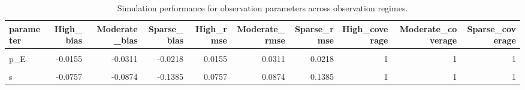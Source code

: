 \begin{table}[!h]
\centering
\caption{\label{tab:tab:obs_regime}Simulation performance for observation parameters across observation regimes.}
\centering
\fontsize{8}{10}\selectfont
\begin{tabular}[t]{lrrrrrrrrr}
\toprule
parameter & High\_bias & Moderate\_bias & Sparse\_bias & High\_rmse & Moderate\_rmse & Sparse\_rmse & High\_coverage & Moderate\_coverage & Sparse\_coverage\\
\midrule
\cellcolor{gray!10}{c} & \cellcolor{gray!10}{-0.1225} & \cellcolor{gray!10}{-0.0934} & \cellcolor{gray!10}{-0.1309} & \cellcolor{gray!10}{0.1225} & \cellcolor{gray!10}{0.0934} & \cellcolor{gray!10}{0.1309} & \cellcolor{gray!10}{1} & \cellcolor{gray!10}{1} & \cellcolor{gray!10}{1}\\
p\_E & -0.0155 & -0.0311 & -0.0218 & 0.0155 & 0.0311 & 0.0218 & 1 & 1 & 1\\
\cellcolor{gray!10}{p\_I} & \cellcolor{gray!10}{-0.0492} & \cellcolor{gray!10}{-0.0916} & \cellcolor{gray!10}{-0.1375} & \cellcolor{gray!10}{0.0492} & \cellcolor{gray!10}{0.0916} & \cellcolor{gray!10}{0.1375} & \cellcolor{gray!10}{1} & \cellcolor{gray!10}{1} & \cellcolor{gray!10}{1}\\
s & -0.0757 & -0.0874 & -0.1385 & 0.0757 & 0.0874 & 0.1385 & 1 & 1 & 1\\
\bottomrule
\end{tabular}
\end{table}
